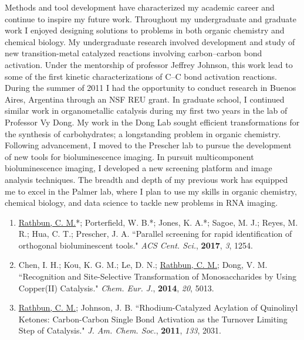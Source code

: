 \documentclass{nihbiosketch}
\begin{document}
\begin{statement}
Methods and tool development have characterized my academic career and continue
to inspire my future work. Throughout my undergraduate and graduate work I
enjoyed designing solutions to problems in both organic chemistry and chemical
biology. My undergraduate research involved development and study of new
transition-metal catalyzed reactions involving carbon--carbon bond activation.
Under the mentorship of professor Jeffrey Johnson, this work lead to some of the
first kinetic characterizations of C--C bond activation reactions. During the
summer of 2011 I had the opportunity to conduct research in Buenos Aires,
Argentina through an NSF REU grant. In graduate school, I continued similar work
in organometallic catalysis during my first two years in the lab of Professor Vy
Dong. My work in the Dong Lab sought efficient transformations for the synthesis
of carbohydrates; a longstanding problem in organic chemistry. Following
advancement, I moved to the Prescher lab
to pursue the development of new tools for bioluminescence imaging. In pursuit
multicomponent bioluminescence imaging, I developed a new screening platform
and image analysis techniques. The breadth and depth of my previous work has
equipped me to excel in the Palmer lab, where I plan to use my skills in
organic chemistry, chemical biology, and data science to tackle new problems in
RNA imaging.

\begin{enumerate}

  \item \underline{Rathbun, C. M.}*; Porterfield, W. B.*; Jones, K. A.*; Sagoe, M. J.; Reyes, M. R.; Hua, C. T.; Prescher, J. A. ``Parallel screening for rapid identification of orthogonal bioluminescent tools." \textit{ACS Cent. Sci.}, \textbf{2017}, \textit{3}, 1254.

  \item Chen, I. H.; Kou, K. G. M.; Le, D. N.; \underline{Rathbun, C. M.}; Dong, V. M. ``Recognition and Site-Selective Transformation of Monosaccharides by Using Copper(II) Catalysis." \textit{Chem. Eur. J.}, \textbf{2014}, \textit{20}, 5013.

  \item \underline{Rathbun, C. M.}; Johnson, J. B. ``Rhodium-Catalyzed Acylation of Quinolinyl Ketones: Carbon-Carbon Single Bond Activation as the Turnover Limiting Step of Catalysis." \textit{J. Am. Chem. Soc.}, \textbf{2011}, \textit{133}, 2031.

\end{enumerate}

\end{statement}
\end{document}

